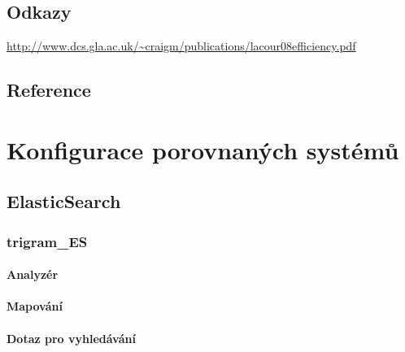 \documentclass[12pt,letterpaper,oneside,openright]{book}
\begin{document}
\section*{Odkazy}
\url{http://www.dcs.gla.ac.uk/~craigm/publications/lacour08efficiency.pdf}

\newpage
\section*{Reference}



\appendix
\chapter{Konfigurace porovnaných systémů} \label{appendix:search_config}
\section{ElasticSearch}
\subsection{trigram\_ES}
\subsubsection{Analyzér}


\subsubsection{Mapování}


\subsubsection{Dotaz pro vyhledávání}



\backmatter
\end{document}
